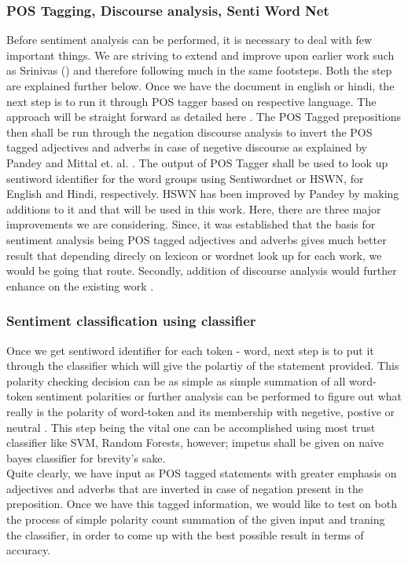 \documentclass[12pt]{book}
\begin{document}
\subsubsection{POS Tagging, Discourse analysis, Senti Word Net}
Before sentiment analysis can be performed, it is necessary to deal with few
important things. We are striving to extend and improve upon earlier work such
as Srinivas (\cite{sharma_text_2015}) and therefore following much in the same
footsteps. Both the step are explained further below.
Once we have the document in english or hindi, the next step is to run it
through POS tagger based on respective language. The approach will be straight
forward as detailed here \cite{vyas_pos_2014}. The POS Tagged prepositions
then shall be run through the negation discourse analysis to invert the POS
tagged adjectives and adverbs in case of negetive discourse as explained by Pandey
\cite{pandey_framework_2015} and Mittal et. al. \cite{mittal_sentiment_2013}.
The output of POS Tagger shall be used to look up sentiword identifier for the
word groups using Sentiwordnet or HSWN, for English and Hindi, respectively.
HSWN has been improved by Pandey \cite{pandey_framework_2015} by making
additions to it and that will be used in this work. Here, there are three major
improvements we are considering. Since, it was established
\cite{shashank_sharma_sentiment_????} that the basis for sentiment analysis
being POS tagged adjectives and adverbs gives much better result that depending
direcly on lexicon or wordnet look up for each work, we would be going that
route. Secondly, addition of discourse analysis would further enhance on the
existing work \cite{shashank_sharma_sentiment_????}.

\subsubsection{Sentiment classification using classifier}
Once we get sentiword identifier for each token - word, next step is to put it
through the classifier which will give the polartiy of the statement provided.
This polarity checking decision can be as simple as simple summation of all
word-token sentiment polarities or further analysis can be performed to figure
out what really is the polarity of word-token and its membership with negetive,
postive or neutral . This step being the vital one can be accomplished using
most trust classifier like SVM, Random Forests, however; impetus shall be given
on naive bayes classifier for brevity's sake. \\
Quite clearly, we have input as POS tagged statements with greater emphasis on
adjectives and adverbs that are inverted in case of negation present in the
preposition. Once we have this tagged information, we would like to test on
both the process of simple polarity count summation of the given input and
traning the classifier, in order to come up with the best possible result in
terms of accuracy.\\
\end{document}

